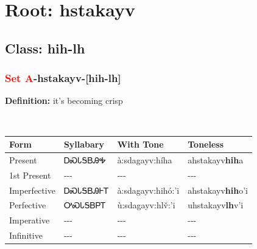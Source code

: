\needspace{4in}
\section*{Root: hstakayv}
\nopagebreak
{}
\needspace{3in}
\subsection*{Class: hih-lh}
\nopagebreak
\needspace{2in}
\subsubsection*{\textcolor{Red}{Set A}{-}\textbf{hstakayv}{-}[hih-lh]}
\nopagebreak
\textbf{Definition: } it{\textquoteright}s becoming crisp
\\[0.5em]
\begin{tabularx}{\textwidth}{l X X X}%
\toprule%
\textbf{Form}&\textbf{Syllabary}&\textbf{With Tone}&\textbf{Toneless}\\%
\midrule%
Present&ᎠᏍᏓᎦᏴᎯᎭ&à:sdagayv:híha&ahstakayv\textbf{hih}a\\%
1st Present&{-}{-}{-}&{-}{-}{-}&{-}{-}{-}\\%
Imperfective&ᎠᏍᏓᎦᏴᎯᎰᎢ&à:sdagayv:hihó:’i&ahstakayv\textbf{hih}o'i\\%
Perfective&ᎤᏍᏓᎦᏴᏢᎢ&ù:sdagayv:hlv̌:’i&uhstakayv\textbf{lh}v'i\\%
Imperative&{-}{-}{-}&{-}{-}{-}&{-}{-}{-}\\%
Infinitive&{-}{-}{-}&{-}{-}{-}&{-}{-}{-}\\%
\bottomrule%
\end{tabularx}
\\[1em]